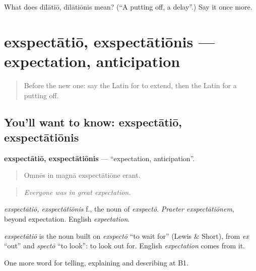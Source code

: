 \begin{tcolorbox}[breakable,colback=teal!4,colframe=teal!35!black,title={Before you move on}]
What does dīlātiō, dīlātiōnis mean? (\textquotedblleft{}A putting off, a delay\textquotedblright{}.) Say it once more.
\end{tcolorbox}
\section[exspectātiō, exspectātiōnis]{exspectātiō, exspectātiōnis — expectation, anticipation}

\label{lesson:LA-C395-exspectatio}



\begin{quote}
Before the new one: say the Latin for to extend, then the Latin for a putting off.
\end{quote}

\subsection*{You'll want to know: exspectātiō, exspectātiōnis}
\textbf{exspectātiō, exspectātiōnis} — \textquotedblleft{}expectation, anticipation\textquotedblright{}.

\begin{quote}
Omnēs in magnā exspectātiōne erant.
\end{quote}

\begin{quote}
\emph{Everyone was in great expectation.}
\end{quote}

\emph{exspectātiō, exspectātiōnis} f., the noun of \emph{exspectō}. \emph{Praeter exspectātiōnem}, beyond expectation. English \emph{expectation}.

\begin{cousinweb}
\emph{exspectātiō} is the noun built on \emph{exspectō} \textquotedblleft{}to wait for\textquotedblright{} (Lewis \& Short), from \emph{ex} \textquotedblleft{}out\textquotedblright{} and \emph{spectō} \textquotedblleft{}to look\textquotedblright{}: to look out for. English \emph{expectation} comes from it.
\end{cousinweb}

\begin{grammarlens}[title={What you've built}]
One more word for telling, explaining and describing at B1.
\end{grammarlens}

